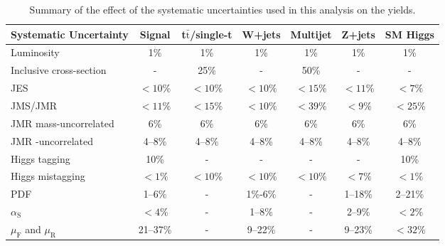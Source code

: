 \begin{table}
    \center
    \caption{Summary of the effect of the systematic uncertainties used in this analysis on the yields.}
    \begin{adjustbox}{width=\textwidth}
    \begin{tabular}{|l|c|c|c|c|c|c|}
    \hline
	Systematic Uncertainty    & Signal    & t$\bar{\mathrm{t}}$/single-t & W+jets  & Multijet & Z+jets  & SM Higgs   \\ \hline
	Luminosity                & 1\%       & 1\%             & 1\%      & 1\%      & 1\%      & 1\%      \\
	Inclusive cross-section   & -        & 25\%            & -       & 50\%     & -       & -       \\
    JES                       & $<10\%$   & $<10\%$         & $<10\%$  & $<15\%$  & $<11\%$  & $<7\%$   \\
    JMS/JMR                   & $<11\%$   & $<15\%$         & $<10\%$  & $<39\%$  & $<9\%$   & $<25\%$  \\
	JMR mass-uncorrelated       & 6\%       & 6\%             & 6\%      & 6\%      & 6\%      & 6\%      \\
	JMR \mt-uncorrelated        & 4--8\%   & 4--8\%         & 4--8\%  & 4--8\%  & 4--8\%  & 4--8\%  \\
	Higgs tagging               & 10\%      & -             & -       & -      & -       & 10\%     \\
	Higgs mistagging            & $<1\%$    & $<10\%$         & $<10\%$  & $<10\%$  & $<7\%$   & $<1\%$   \\
	PDF			            & 1--6\%   & -              & 1\%-6\%  & -       & 1--18\% & 2--21\% \\
	$\alpha_{\text{S}}$                & $<4\%$    & -              & 1--8\%  & -       & 2--9\%  & $<2\%$   \\
	$\mu_{\text{F}}$ and $\mu_{\text{R}}$       & 21--37\% & -              & 9--22\% & -       & 9--23\% & $<32\%$  \\
	\hline
    \end{tabular}
    \end{adjustbox}
    \label{tab:systematics}
\end{table}

